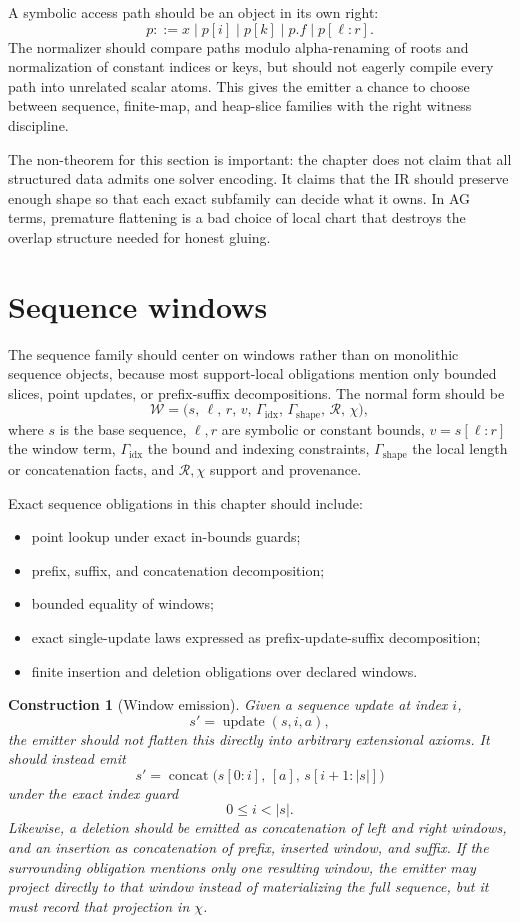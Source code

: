 \documentclass[11pt]{report}
\newtheorem{construction}[definition]{Construction}
\begin{document}
A symbolic access path should be an object in its own right:
\[
p ::= x \mid p[i] \mid p[k] \mid p.f \mid p[\ell{:}r].
\]
The normalizer should compare paths modulo alpha-renaming of roots and normalization of constant indices or keys, but should not eagerly compile every path into unrelated scalar atoms. This gives the emitter a chance to choose between sequence, finite-map, and heap-slice families with the right witness discipline.

The non-theorem for this section is important: the chapter does not claim that all structured data admits one solver encoding. It claims that the IR should preserve enough shape so that each exact subfamily can decide what it owns. In AG terms, premature flattening is a bad choice of local chart that destroys the overlap structure needed for honest gluing.
\section{Sequence windows}
The sequence family should center on windows rather than on monolithic sequence objects, because most support-local obligations mention only bounded slices, point updates, or prefix-suffix decompositions. The normal form should be
\[
\mathcal{W}
=
\bigl(
s,\,
\ell,\,
r,\,
v,\,
\Gamma_{\mathrm{idx}},\,
\Gamma_{\mathrm{shape}},\,
\mathcal{R},\,
\chi
\bigr),
\]
where $s$ is the base sequence, $\ell,r$ are symbolic or constant bounds, $v = s[\ell{:}r]$ the window term, $\Gamma_{\mathrm{idx}}$ the bound and indexing constraints, $\Gamma_{\mathrm{shape}}$ the local length or concatenation facts, and $\mathcal{R},\chi$ support and provenance.

Exact sequence obligations in this chapter should include:
\begin{itemize}
\item point lookup under exact in-bounds guards;
\item prefix, suffix, and concatenation decomposition;
\item bounded equality of windows;
\item exact single-update laws expressed as prefix-update-suffix decomposition;
\item finite insertion and deletion obligations over declared windows.
\end{itemize}

\begin{construction}[Window emission]
Given a sequence update at index $i$,
\[
s' = \operatorname{update}(s,i,a),
\]
the emitter should not flatten this directly into arbitrary extensional axioms. It should instead emit
\[
s' = \operatorname{concat}\bigl(
s[0{:}i],\,
[a],\,
s[i+1{:}|s|]
\bigr)
\]
under the exact index guard
\[
0 \le i < |s|.
\]
Likewise, a deletion should be emitted as concatenation of left and right windows, and an insertion as concatenation of prefix, inserted window, and suffix. If the surrounding obligation mentions only one resulting window, the emitter may project directly to that window instead of materializing the full sequence, but it must record that projection in $\chi$.
\end{construction}
\end{document}
